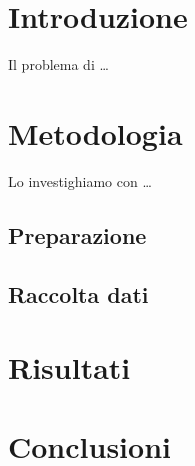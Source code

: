 \documentclass{article}
\begin{document}
\section{Introduzione}
Il problema di \ldots

\section{Metodologia}
Lo investighiamo con \ldots

\subsection{Preparazione}

\subsection{Raccolta dati}

\section{Risultati}

\section{Conclusioni}
\end{document}
